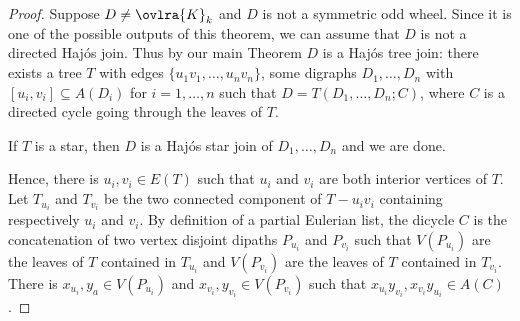 \begin{proof}
    Suppose $D \neq \ovlra{K}_k$ and $D$ is not a symmetric odd wheel. Since it is one of the possible outputs of this theorem, we can assume that $D$ is not a directed Haj\'os join.  Thus by our main Theorem $D$ is a Haj\'os tree join:  there exists a tree $T$ with edges $\{u_1v_1, \dots, u_nv_n\}$, some  digraphs $D_1, \dots, D_n$ with $[u_i,v_i] \subseteq A(D_i)$ for $i=1, \dots, n$ such that $D=T(D_1, \dots, D_n;C)$, where $C$ is a directed cycle going through  the leaves of $T$.
    \smallskip


    


    If $T$ is a star, then $D$ is a Haj\'os star join of $D_1, \dots, D_n$ and we are done.
    \smallskip 
    
    Hence, there is $u_i,v_i \in E(T)$ such that $u_i$ and $v_i$ are both interior vertices of $T$.  
    Let $T_{u_i}$ and $T_{v_i}$ be the two connected component of $T-u_iv_i$ containing respectively $u_i$ and $v_i$. 
    By definition of a partial Eulerian list, the dicycle $C$ is the concatenation of two vertex disjoint dipaths $P_{u_i}$ and $P_{v_i}$ such that $V(P_{u_i})$ are the leaves of $T$ contained in $T_{u_i}$ and $V(P_{v_i})$ are the leaves of $T$ contained in $T_{v_i}$.
    There is $x_{u_i}, y_{a} \in V(P_{u_i})$ and $x_{v_i}, y_{v_i} \in V(P_{v_i})$ such that $x_{u_i}y_{v_i}, x_{v_i}y_{u_i} \in A(C)$. 


\end{proof}

